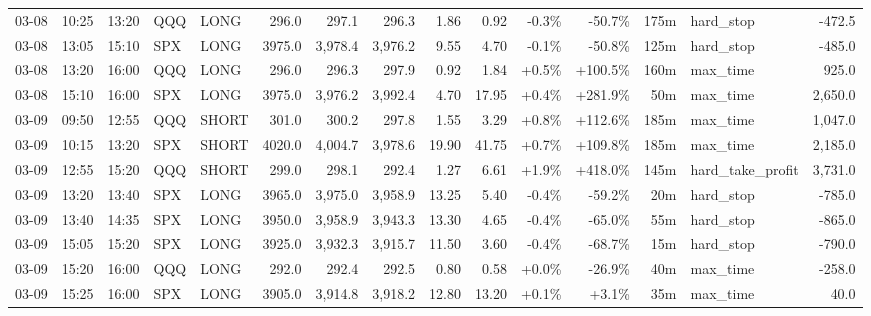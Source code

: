 \documentclass[11pt,a4paper,twoside]{article}
\begin{document}
\begin{landscape}
\begin{center}
\begin{longtable}{>{\color{txtmain}}l l l l l r r r r r r r r >{\color{txtmain}}l r}
03-08 & 10:25 & 13:20 & QQQ & LONG & 296.0 & 297.1 & 296.3 & 1.86 & 0.92 & \textcolor{lossred}{-0.3\%} & \textcolor{lossred}{-50.7\%} & 175m & hard\_stop & \textcolor{lossred}{-472.5} \\
03-08 & 13:05 & 15:10 & SPX & LONG & 3975.0 & 3,978.4 & 3,976.2 & 9.55 & 4.70 & \textcolor{lossred}{-0.1\%} & \textcolor{lossred}{-50.8\%} & 125m & hard\_stop & \textcolor{lossred}{-485.0} \\
03-08 & 13:20 & 16:00 & QQQ & LONG & 296.0 & 296.3 & 297.9 & 0.92 & 1.84 & \textcolor{wingreen}{+0.5\%} & \textcolor{wingreen}{+100.5\%} & 160m & max\_time & \textcolor{wingreen}{925.0} \\
03-08 & 15:10 & 16:00 & SPX & LONG & 3975.0 & 3,976.2 & 3,992.4 & 4.70 & 17.95 & \textcolor{wingreen}{+0.4\%} & \textcolor{wingreen}{+281.9\%} & 50m & max\_time & \textcolor{wingreen}{2,650.0} \\
03-09 & 09:50 & 12:55 & QQQ & SHORT & 301.0 & 300.2 & 297.8 & 1.55 & 3.29 & \textcolor{wingreen}{+0.8\%} & \textcolor{wingreen}{+112.6\%} & 185m & max\_time & \textcolor{wingreen}{1,047.0} \\
03-09 & 10:15 & 13:20 & SPX & SHORT & 4020.0 & 4,004.7 & 3,978.6 & 19.90 & 41.75 & \textcolor{wingreen}{+0.7\%} & \textcolor{wingreen}{+109.8\%} & 185m & max\_time & \textcolor{wingreen}{2,185.0} \\
03-09 & 12:55 & 15:20 & QQQ & SHORT & 299.0 & 298.1 & 292.4 & 1.27 & 6.61 & \textcolor{wingreen}{+1.9\%} & \textcolor{wingreen}{+418.0\%} & 145m & hard\_take\_profit & \textcolor{wingreen}{3,731.0} \\
03-09 & 13:20 & 13:40 & SPX & LONG & 3965.0 & 3,975.0 & 3,958.9 & 13.25 & 5.40 & \textcolor{lossred}{-0.4\%} & \textcolor{lossred}{-59.2\%} & 20m & hard\_stop & \textcolor{lossred}{-785.0} \\
03-09 & 13:40 & 14:35 & SPX & LONG & 3950.0 & 3,958.9 & 3,943.3 & 13.30 & 4.65 & \textcolor{lossred}{-0.4\%} & \textcolor{lossred}{-65.0\%} & 55m & hard\_stop & \textcolor{lossred}{-865.0} \\
03-09 & 15:05 & 15:20 & SPX & LONG & 3925.0 & 3,932.3 & 3,915.7 & 11.50 & 3.60 & \textcolor{lossred}{-0.4\%} & \textcolor{lossred}{-68.7\%} & 15m & hard\_stop & \textcolor{lossred}{-790.0} \\
03-09 & 15:20 & 16:00 & QQQ & LONG & 292.0 & 292.4 & 292.5 & 0.80 & 0.58 & \textcolor{wingreen}{+0.0\%} & \textcolor{lossred}{-26.9\%} & 40m & max\_time & \textcolor{lossred}{-258.0} \\
03-09 & 15:25 & 16:00 & SPX & LONG & 3905.0 & 3,914.8 & 3,918.2 & 12.80 & 13.20 & \textcolor{wingreen}{+0.1\%} & \textcolor{wingreen}{+3.1\%} & 35m & max\_time & \textcolor{wingreen}{40.0} \\

\end{longtable}
\end{center}
\end{landscape}
\end{document}
